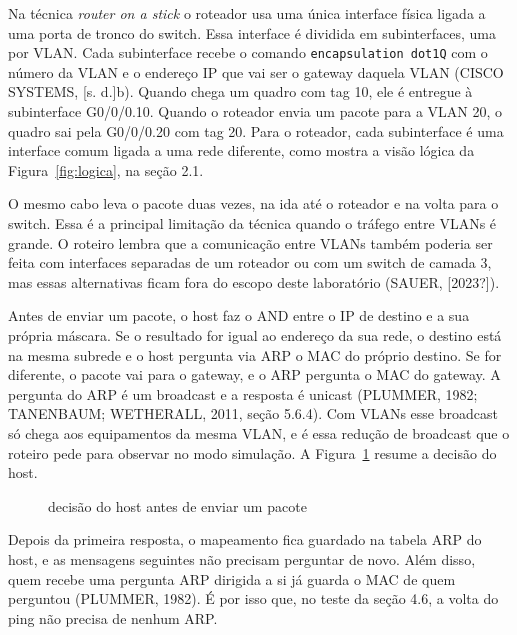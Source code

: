 
Na técnica \emph{router on a stick} o roteador usa uma única interface física ligada a uma porta de tronco do switch. Essa interface é dividida em subinterfaces, uma por VLAN. Cada subinterface recebe o comando \texttt{encapsulation dot1Q} com o número da VLAN e o endereço IP que vai ser o gateway daquela VLAN (CISCO SYSTEMS, [s. d.]b). Quando chega um quadro com tag 10, ele é entregue à subinterface G0/0/0.10. Quando o roteador envia um pacote para a VLAN 20, o quadro sai pela G0/0/0.20 com tag 20. Para o roteador, cada subinterface é uma interface comum ligada a uma rede diferente, como mostra a visão lógica da Figura~\ref{fig:logica}, na seção 2.1.

O mesmo cabo leva o pacote duas vezes, na ida até o roteador e na volta para o switch. Essa é a principal limitação da técnica quando o tráfego entre VLANs é grande. O roteiro lembra que a comunicação entre VLANs também poderia ser feita com interfaces separadas de um roteador ou com um switch de camada 3, mas essas alternativas ficam fora do escopo deste laboratório (SAUER, [2023?]).


Antes de enviar um pacote, o host faz o AND entre o IP de destino e a sua própria máscara. Se o resultado for igual ao endereço da sua rede, o destino está na mesma subrede e o host pergunta via ARP o MAC do próprio destino. Se for diferente, o pacote vai para o gateway, e o ARP pergunta o MAC do gateway. A pergunta do ARP é um broadcast e a resposta é unicast (PLUMMER, 1982; TANENBAUM; WETHERALL, 2011, seção 5.6.4). Com VLANs esse broadcast só chega aos equipamentos da mesma VLAN, e é essa redução de broadcast que o roteiro pede para observar no modo simulação. A Figura~\ref{fig:decisao} resume a decisão do host.

\begin{figure}[H]
\captionsetup{position=top}
\caption{decisão do host antes de enviar um pacote}\label{fig:decisao}
\centering

\end{figure}

Depois da primeira resposta, o mapeamento fica guardado na tabela ARP do host, e as mensagens seguintes não precisam perguntar de novo. Além disso, quem recebe uma pergunta ARP dirigida a si já guarda o MAC de quem perguntou (PLUMMER, 1982). É por isso que, no teste da seção 4.6, a volta do ping não precisa de nenhum ARP.

